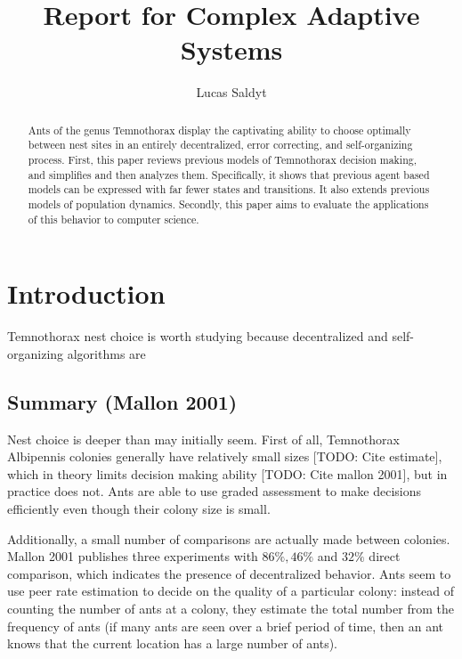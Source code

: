 \documentclass[letterpaper]{article}
\title{Report for Complex Adaptive Systems}
\author{Lucas Saldyt}
\begin{document}
\maketitle

\begin{abstract}
    Ants of the genus Temnothorax display the captivating ability to choose optimally between nest sites in an entirely decentralized, error correcting, and self-organizing process.
    First, this paper reviews previous models of Temnothorax decision making, and simplifies and then analyzes them.
    Specifically, it shows that previous agent based models can be expressed with far fewer states and transitions. 
    It also extends previous models of population dynamics.
    Secondly, this paper aims to evaluate the applications of this behavior to computer science.
\end{abstract}

\section{Introduction}

Temnothorax nest choice is worth studying because decentralized and self-organizing algorithms are  

\subsection{Summary (Mallon 2001)}

Nest choice is deeper than may initially seem.
First of all, Temnothorax Albipennis colonies generally have relatively small sizes [TODO: Cite estimate], which in theory limits decision making ability [TODO: Cite mallon 2001], but in practice does not. 
Ants are able to use graded assessment to make decisions efficiently even though their colony size is small.

Additionally, a small number of comparisons are actually made between colonies. 
Mallon 2001 publishes three experiments with $86\%, 46\%$ and $32\%$ direct comparison, which indicates the presence of decentralized behavior.
Ants seem to use peer rate estimation to decide on the quality of a particular colony: instead of counting the number of ants at a colony, they estimate the total number from the frequency of ants (if many ants are seen over a brief period of time, then an ant knows that the current location has a large number of ants).
\end{document}
